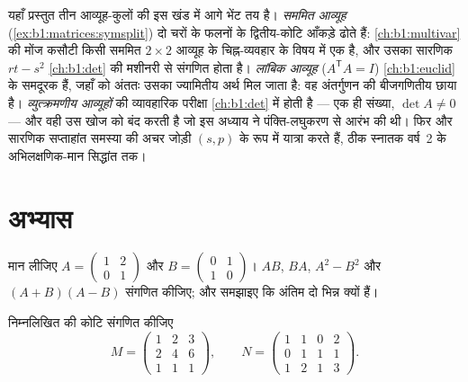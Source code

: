 \begin{remark}[पुस्तक 3 के भीतर के परिदृश्य]
\label{rem:b1:matrices:perspectives}
यहाँ प्रस्तुत तीन आव्यूह-कुलों की इस खंड में आगे भेंट तय है। \emph{सममित
आव्यूह} (\cref{ex:b1:matrices:symsplit}) दो चरों के फलनों के द्वितीय-कोटि
आँकड़े ढोते हैं: \cref{ch:b1:multivar} की मोंज कसौटी किसी सममित $2\times2$
आव्यूह के चिह्न-व्यवहार के विषय में एक  है, और उसका सारणिक $rt - s^2$
\cref{ch:b1:det} की मशीनरी से संगणित होता है। \emph{लांबिक आव्यूह}
($A^{\mathsf T}A = I$) \cref{ch:b1:euclid} के समदूरक हैं, जहाँ  को
अंततः उसका ज्यामितीय अर्थ मिल जाता है: वह अंतर्गुणन की बीजगणितीय छाया है।
\emph{व्युत्क्रमणीय आव्यूहों} की व्यावहारिक परीक्षा \cref{ch:b1:det} में
होती है --- एक ही संख्या, $\det A \neq 0$ --- और वही उस खोज को बंद करती है
जो इस अध्याय ने पंक्ति-लघुकरण से आरंभ की थी। फिर  और सारणिक सप्ताहांत
समस्या की अचर जोड़ी $(s, p)$ के रूप में यात्रा करते हैं, ठीक स्नातक वर्ष~2
के अभिलक्षणिक-मान सिद्धांत तक।
\end{remark}

\section{अभ्यास}

\begin{exercise}[$\star$]\label{exo:b1:matrices:1}
मान लीजिए $A = \begin{pmatrix} 1 & 2 \\ 0 & 1 \end{pmatrix}$ और $B =
\begin{pmatrix} 0 & 1 \\ 1 & 0\end{pmatrix}$। $AB$, $BA$, $A^2 - B^2$ और
$(A+B)(A-B)$ संगणित कीजिए; और समझाइए कि अंतिम दो भिन्न क्यों हैं।
\end{exercise}

\begin{exercise}[$\star$]\label{exo:b1:matrices:2}
निम्नलिखित की कोटि संगणित कीजिए
\[
M = \begin{pmatrix}
1 & 2 & 3\\
2 & 4 & 6\\
1 & 1 & 1
\end{pmatrix},
\qquad
N = \begin{pmatrix}
1 & 1 & 0 & 2\\
0 & 1 & 1 & 1\\
1 & 2 & 1 & 3
\end{pmatrix}.
\]
\end{exercise}

